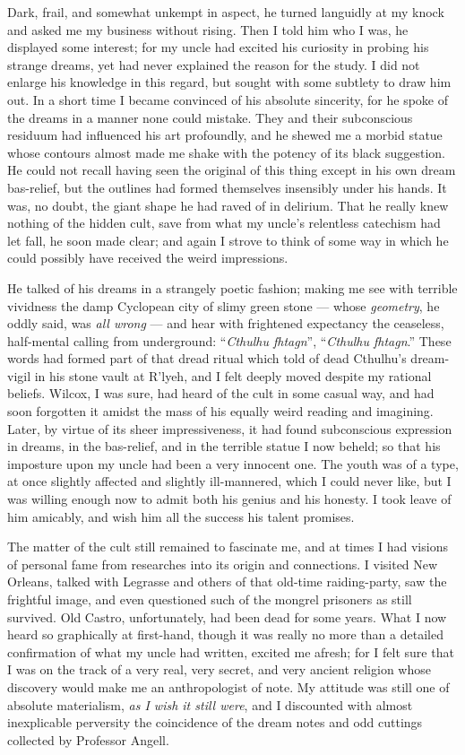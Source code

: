 \begin{pages}
\begin{Leftside}
Dark, frail, and somewhat unkempt in aspect, he turned languidly at my
knock and asked me my business without rising. Then I told him who I
was, he displayed some interest; for my uncle had excited his curiosity
in probing his strange dreams, yet had never explained the reason for
the study. I did not enlarge his knowledge in this regard, but sought
with some subtlety to draw him out. In a short time I became convinced
of his absolute sincerity, for he spoke of the dreams in a manner none
could mistake. They and their subconscious residuum had influenced his
art profoundly, and he shewed me a morbid statue whose contours almost
made me shake with the potency of its black suggestion. He could not
recall having seen the original of this thing except in his own dream
bas-relief, but the outlines had formed themselves insensibly under his
hands. It was, no doubt, the giant shape he had raved of in delirium.
That he really knew nothing of the hidden cult, save from what my
uncle's relentless catechism had let fall, he soon made clear; and again
I strove to think of some way in which he could possibly have received
the weird impressions.

He talked of his dreams in a strangely poetic fashion; making me see
with terrible vividness the damp Cyclopean city of slimy green stone ---
whose \emph{geometry}, he oddly said, was \emph{all wrong} --- and hear with frightened
expectancy the ceaseless, half-mental calling from underground:
``\emph{Cthulhu fhtagn}'', ``\emph{Cthulhu fhtagn}.''
These words had formed part of that dread ritual which told of dead
Cthulhu's dream-vigil in his stone vault at R'lyeh, and I felt deeply
moved despite my rational beliefs. Wilcox, I was sure, had heard of the
cult in some casual way, and had soon forgotten it amidst the mass of
his equally weird reading and imagining. Later, by virtue of its sheer
impressiveness, it had found subconscious expression in dreams, in the
bas-relief, and in the terrible statue I now beheld; so that his
imposture upon my uncle had been a very innocent one. The youth was of a
type, at once slightly affected and slightly ill-mannered, which I could
never like, but I was willing enough now to admit both his genius and
his honesty. I took leave of him amicably, and wish him all the success
his talent promises.


The matter of the cult still remained to fascinate me, and at times I
had visions of personal fame from researches into its origin and
connections. I visited New Orleans, talked with Legrasse and others of
that old-time raiding-party, saw the frightful image, and even
questioned such of the mongrel prisoners as still survived. Old Castro,
unfortunately, had been dead for some years. What I now heard so
graphically at first-hand, though it was really no more than a detailed
confirmation of what my uncle had written, excited me afresh; for I felt
sure that I was on the track of a very real, very secret, and very
ancient religion whose discovery would make me an anthropologist of
note. My attitude was still one of absolute materialism, \emph{as I wish it
still were}, and I discounted with almost inexplicable perversity the
coincidence of the dream notes and odd cuttings collected by Professor
Angell.



\end{Leftside}
\end{pages}

